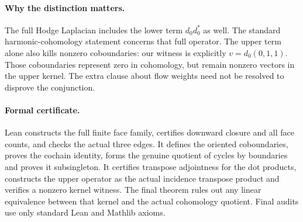 \documentclass[11pt]{article}
\begin{document}
\paragraph{Why the distinction matters.}
The full Hodge Laplacian includes the lower term
$d_0d_0^*$ as well. The standard harmonic-cohomology statement
concerns that full operator. The upper term alone also kills
nonzero coboundaries: our witness is explicitly
$v=d_0(0,1,1)$. Those coboundaries represent zero in cohomology,
but remain nonzero vectors in the upper kernel. The extra clause
about flow weights need not be resolved to disprove the conjunction.

\paragraph{Formal certificate.}
Lean constructs the full finite face family, certifies downward
closure and all face counts, and checks the actual three edges.
It defines the oriented coboundaries, proves the cochain identity,
forms the genuine quotient of cycles by boundaries and proves it
subsingleton. It certifies transpose adjointness for the dot
products, constructs the upper operator as the actual incidence
transpose product and verifies a nonzero kernel witness. The
final theorem rules out any linear equivalence between that kernel
and the actual cohomology quotient. Final audits use only standard
Lean and Mathlib axioms.
\end{document}
